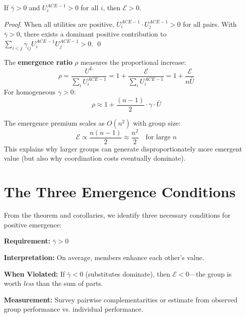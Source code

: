 \begin{corollary}
\label{cor:sufficient}
If $\bar{\gamma} > 0$ and $U^{ACE-1}_i > 0$ for all $i$, then $\mathcal{E} > 0$.
\end{corollary}

\begin{proof}
When all utilities are positive, $U^{ACE-1}_i \cdot U^{ACE-1}_j > 0$ for all pairs.
With $\bar{\gamma} > 0$, there exists a dominant positive contribution to
$\sum_{i<j} \gamma_{ij} U^{ACE-1}_i U^{ACE-1}_j > 0$. \qed
\end{proof}

\begin{corollary}
\label{cor:ratio}
The \textbf{emergence ratio} $\rho$ measures the proportional increase:
\begin{equation}
\rho = \frac{U^L}{\sum_i U^{ACE-1}_i} = 1 + \frac{\mathcal{E}}{\sum_i U^{ACE-1}_i} = 1 + \frac{\mathcal{E}}{n \bar{U}}
\label{eq:emergence-ratio}
\end{equation}
For homogeneous $\gamma > 0$:
\begin{equation}
\rho \approx 1 + \frac{(n-1)}{2} \cdot \gamma \cdot \bar{U}
\end{equation}
\end{corollary}

\begin{corollary}
\label{cor:scaling}
The emergence premium scales as $O(n^2)$ with group size:
\begin{equation}
\mathcal{E} \propto \frac{n(n-1)}{2} \approx \frac{n^2}{2} \quad \text{for large } n
\end{equation}
This explains why larger groups can generate disproportionately more emergent value
(but also why coordination costs eventually dominate).
\end{corollary}


\section{The Three Emergence Conditions}
\label{sec:let-conditions}

From the theorem and corollaries, we identify three necessary conditions for
positive emergence:

\begin{tcolorbox}[colback=gray!5!white, colframe=gray!75!black,
    title=LET Condition 1: Positive Average Complementarity]

\textbf{Requirement:} $\bar{\gamma} > 0$

\textbf{Interpretation:} On average, members enhance each other's value.

\textbf{When Violated:} If $\bar{\gamma} < 0$ (substitutes dominate), then
$\mathcal{E} < 0$---the group is worth \textit{less} than the sum of parts.

\textbf{Measurement:} Survey pairwise complementarities or estimate from
observed group performance vs. individual performance.
\end{tcolorbox}

